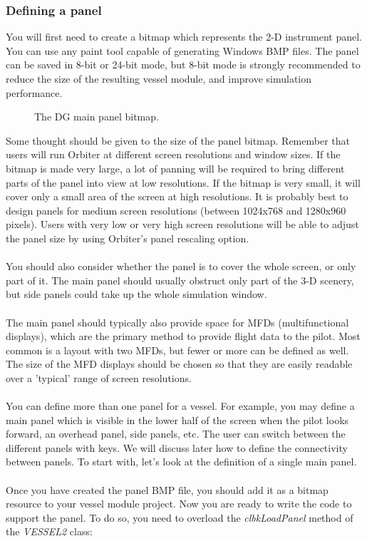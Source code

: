 \documentclass[Orbiter Developer Manual.tex]{subfiles}
\begin{document}
\subsubsection{Defining a panel}
You will first need to create a bitmap which represents the 2-D instrument panel. You can use any paint tool capable of generating Windows BMP files. The panel can be saved in 8-bit or 24-bit mode, but 8-bit mode is strongly recommended to reduce the size of the resulting vessel module, and improve simulation performance.

\begin{figure}[H]
	\centering
	\caption{The DG main panel bitmap.}
\end{figure}

\noindent
Some thought should be given to the size of the panel bitmap. Remember that users will run Orbiter at different screen resolutions and window sizes. If the bitmap is made very large, a lot of panning will be required to bring different parts of the panel into view at low resolutions. If the bitmap is very small, it will cover only a small area of the screen at high resolutions. It is probably best to design panels for medium screen resolutions (between 1024x768 and 1280x960 pixels). Users with very low or very high screen resolutions will be able to adjust the panel size by using Orbiter's panel rescaling option.\\
\\
You should also consider whether the panel is to cover the whole screen, or only part of it. The main panel should usually obstruct only part of the 3-D scenery, but side panels could take up the whole simulation window.\\
\\
The main panel should typically also provide space for MFDs (multifunctional displays), which are the primary method to provide flight data to the pilot. Most common is a layout with two MFDs, but fewer or more can be defined as well. The size of the MFD displays should be chosen so that they are easily readable over a 'typical' range of screen resolutions.\\
\\
You can define more than one panel for a vessel. For example, you may define a main panel which is visible in the lower half of the screen when the pilot looks forward, an overhead panel, side panels, etc. The user can switch between the different panels with \Ctrl\DArrow\UArrow\RArrow\LArrow keys. We will discuss later how to define the connectivity between panels. To start with, let's look at the definition of a single main panel.\\
\\
Once you have created the panel BMP file, you should add it as a bitmap resource to your vessel module project. Now you are ready to write the code to support the panel. To do so, you need to overload the \textit{clbkLoadPanel} method of the \textit{VESSEL2} class:
\end{document}
